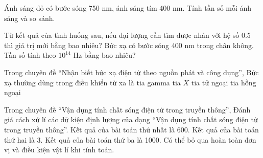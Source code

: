 \begin{ex}
Ánh sáng đỏ có bước sóng 750 nm, ánh sáng tím 400 nm. Tính tần số mỗi ánh sáng và so sánh.
\choiceTF

\end{ex}

\begin{ex}
Từ kết quả của tình huống sau, nếu đại lượng cần tìm được nhân với hệ số 0.5 thì giá trị mới bằng bao nhiêu? Bức xạ có bước sóng 400 nm trong chân không. Tần số tính theo $10^{14}$ Hz bằng bao nhiêu?
\end{ex}

\begin{ex}
Trong chuyên đề “Nhận biết bức xạ điện từ theo nguồn phát và công dụng”, Bức xạ thường dùng trong điều khiển từ xa là
\choice
{tia gamma}
{tia $X$}
{tia tử ngoại}
{\True tia hồng ngoại}
\end{ex}

\begin{ex}
Trong chuyên đề “Vận dụng tính chất sóng điện từ trong truyền thông”, Đánh giá cách xử lí các dữ kiện định lượng của dạng “Vận dụng tính chất sóng điện từ trong truyền thông”.
\choiceTF
{\True Kết quả của bài toán thứ nhất là 600.}
{\True Kết quả của bài toán thứ hai là 3.}
{\True Kết quả của bài toán thứ ba là 1000.}
{Có thể bỏ qua hoàn toàn đơn vị và điều kiện vật lí khi tính toán.}
\end{ex}

